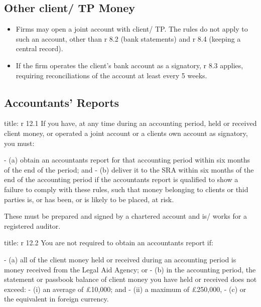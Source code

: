 \documentclass[
]{article}
\newenvironment{Shaded}{}{}
\newcommand{\NormalTok}[1]{#1}
\providecommand{\tightlist}{%
  \setlength{\itemsep}{0pt}\setlength{\parskip}{0pt}}
\begin{document}
\hypertarget{other-client-tp-money}{%
\subsection{Other client/ TP Money}\label{other-client-tp-money}}

\begin{itemize}
\tightlist
\item
  Firms may open a joint account with client/ TP. The rules do not apply
  to such an account, other than r 8.2 (bank statements) and r 8.4
  (keeping a central record).
\item
  If the firm operates the client's bank account as a signatory, r 8.3
  applies, requiring reconciliations of the account at least every 5
  weeks.
\end{itemize}

\hypertarget{accountants-reports}{%
\subsection{Accountants' Reports}\label{accountants-reports}}

\begin{Shaded}
\begin{Highlighting}[]
\NormalTok{title: r 12.1}
\NormalTok{If you have, at any time during an accounting period, held or received client money, or operated a joint account or a client\textquotesingle{}s own account as signatory, you must:}

\NormalTok{{-} (a) obtain an accountant\textquotesingle{}s report for that accounting period within six months of the end of the period; and}
\NormalTok{{-} (b) deliver it to the SRA within six months of the end of the accounting period if the accountant\textquotesingle{}s report is qualified to show a failure to comply with these rules, such that money belonging to clients or thid parties is, or has been, or is likely to be placed, at risk.}
\end{Highlighting}
\end{Shaded}

These must be prepared and signed by a chartered account and is/ works
for a registered auditor.

\begin{Shaded}
\begin{Highlighting}[]
\NormalTok{title: r 12.2}
\NormalTok{You are not required to obtain an accountant\textquotesingle{}s report if:}

\NormalTok{{-} (a) all of the client money held or received during an accounting period is money received from the Legal Aid Agency; or}
\NormalTok{{-} (b) in the accounting period, the statement or passbook balance of client money you have held or received does not exceed:}
\NormalTok{    {-} (i) an average of £10,000; and}
\NormalTok{    {-} (ii) a maximum of £250,000,}
\NormalTok{{-} (c) or the equivalent in foreign currency.}
\end{Highlighting}
\end{Shaded}
\end{document}

